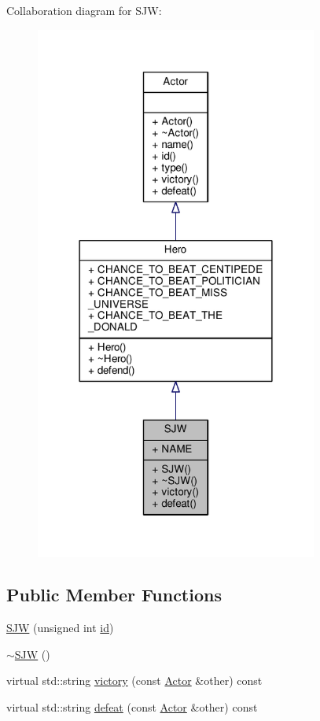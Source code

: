 Collaboration diagram for S\+JW\+:
\nopagebreak
\begin{figure}[H]
\begin{center}
\leavevmode
\includegraphics[width=263pt]{classSJW__coll__graph}
\end{center}
\end{figure}
\subsection*{Public Member Functions}
\begin{DoxyCompactItemize}
\item 
\hyperlink{classSJW_aee0f414b8da298a625c303173cd9bfe2}{S\+JW} (unsigned int \hyperlink{classActor_a084438abd4bcb9d5e17b8ad75b0f5984}{id})
\item 
\hyperlink{classSJW_a28fa43a9925b7308b3f06b004510abeb}{$\sim$\+S\+JW} ()
\item 
virtual std\+::string \hyperlink{classSJW_af9bffa85da9c04559f38210f11a80c1d}{victory} (const \hyperlink{classActor}{Actor} \&other) const 
\item 
virtual std\+::string \hyperlink{classSJW_a04d480d0bedb684591a1a14d41b93257}{defeat} (const \hyperlink{classActor}{Actor} \&other) const 
\end{DoxyCompactItemize}
